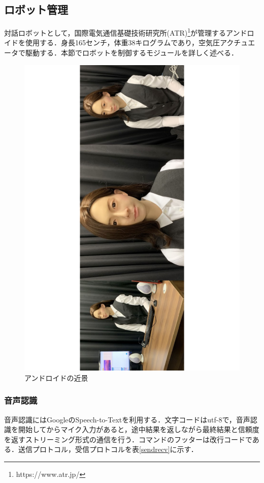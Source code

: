 \subsection{ロボット管理}
\label{対話システムを構成するモジュール}
対話ロボットとして，国際電気通信基礎技術研究所(ATR)\footnote{https://www.atr.jp/}が管理するアンドロイドを使用する．身長165センチ，体重38キログラムであり，空気圧アクチュエータで駆動する．本節でロボットを制御するモジュールを詳しく述べる．
\begin{figure}[th]
    \centering
    \includegraphics[scale=0.5,angle=270]{pic/ai.pdf}
    \caption{アンドロイドの近景}
    \label{kinkei}
\end{figure}

\subsubsection{音声認識}
音声認識にはGoogleのSpeech-to-Textを利用する．文字コードはutf-8で，音声認識を開始してからマイク入力があると，途中結果を返しながら最終結果と信頼度を返すストリーミング形式の通信を行う．コマンドのフッターは改行コードである．送信プロトコル，受信プロトコルを表\ref{sendrecv}に示す．


